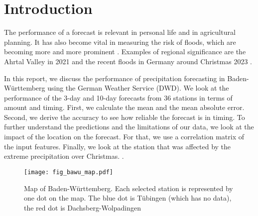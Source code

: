 \documentclass{article}
\theoremstyle{plain}
\theoremstyle{definition}
\theoremstyle{remark}
\begin{document}
\section{Introduction}\label{sec:intro}
The performance of a forecast is relevant in personal life and in agricultural
planning.
It has also become vital in measuring the risk of floods, which are becoming
more and more prominent \cite{FloodTrends}.
Examples of regional significance are the Ahrtal Valley in 2021 \cite{pink} and
the recent floods in Germany around Christmas 2023 \cite{flooding_christmas}.

In this report, we discuss the performance of precipitation forecasting in
Baden-Württemberg using the German Weather Service (DWD).
We look at the performance of the 3-day and 10-day forecasts from 36 stations
in terms of amount and timing. First, we calculate the mean and the mean
absolute error. Second, we derive the accuracy to see how reliable the forecast
is in timing.
To further understand the predictions and the limitations of our data, we look
at the impact of the location on the forecast.
For that, we use a correlation matrix of the input features. Finally, we look
at the station that was affected by the extreme precipitation over Christmas.
\cite{flooding_christmas}.

\begin{figure}[h]
    \centering
    \texttt{[image: fig\_bawu\_map.pdf]}
    \caption{Map of Baden-Württemberg. Each selected station is represented by
        one dot on the map. The blue dot is Tübingen (which has no data), the red dot
        is Dachsberg-Wolpadingen}
    \label{fig:bw-stations}
\end{figure}
\end{document}

